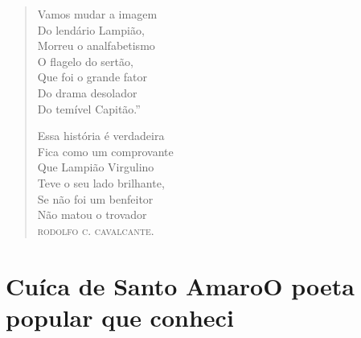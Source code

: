 \begin{verse}
Vamos mudar a imagem \\
Do lendário Lampião, \\
Morreu o analfabetismo \\
O flagelo do sertão, \\
Que foi o grande fator \\
Do drama desolador \\
Do temível Capitão.'' 
\pagebreak

Essa história é verdadeira \\
Fica como um comprovante \\
Que Lampião Virgulino \\
Teve o seu lado brilhante, \\
Se não foi um benfeitor \\
Não matou o trovador \\
\textsc{rodolfo c. cavalcante}. 
\end{verse}

\chapter[Cuíca de Santo Amaro\\ O poeta popular que conheci]{Cuíca de Santo Amaro\break O poeta popular que conheci}

